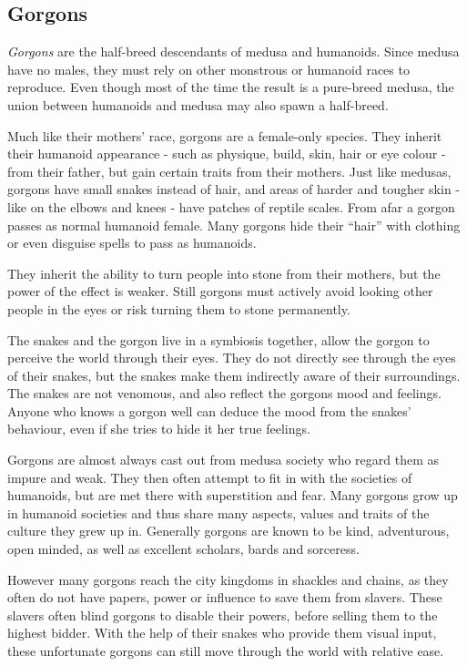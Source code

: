 \subsection{Gorgons}
\label{sec:Gorgons}

\emph{Gorgons} are the half-breed descendants of medusa and humanoids. Since
medusa have no males, they must rely on other monstrous or humanoid races to
reproduce. Even though most of the time the result is a pure-breed medusa, the
union between humanoids and medusa may also spawn a half-breed.

Much like their mothers' race, gorgons are a female-only species. They
inherit their humanoid appearance - such as physique, build, skin, hair or eye
colour - from their father, but gain certain traits from their mothers. Just
like medusas, gorgons have small snakes instead of hair, and areas of harder
and tougher skin - like on the elbows and knees - have patches of reptile
scales. From afar a gorgon passes as normal humanoid female. Many gorgons hide
their ``hair'' with clothing or even disguise spells to pass as humanoids.

They inherit the ability to turn people into stone from their mothers, but
the power of the effect is weaker. Still gorgons must actively avoid looking
other people in the eyes or risk turning them to stone permanently.

The snakes and the gorgon live in a symbiosis together, allow the gorgon to
perceive the world through their eyes. They do not directly see through the
eyes of their snakes, but the snakes make them indirectly aware of their
surroundings. The snakes are not venomous, and also reflect the gorgons mood
and feelings. Anyone who knows a gorgon well can deduce the mood from the
snakes' behaviour, even if she tries to hide it her true feelings.

Gorgons are almost always cast out from medusa society who regard them as impure
and weak. They then often attempt to fit in with the societies of humanoids,
but are met there with superstition and fear. Many gorgons grow up in humanoid
societies and thus share many aspects, values and traits of the culture they
grew up in. Generally gorgons are known to be kind, adventurous, open minded,
as well as excellent scholars, bards and sorceress.

However many gorgons reach the city kingdoms in shackles and chains, as they
often do not have papers, power or influence to save them from slavers. These
slavers often blind gorgons to disable their powers, before selling them to the
highest bidder. With the help of their snakes who provide them visual input,
these unfortunate gorgons can still move through the world with relative ease.

